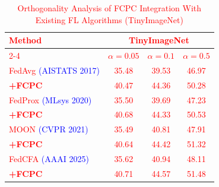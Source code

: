 \documentclass[journal,twoside,web]{ieeecolor}
\newcommand{\rev}[1]{\textcolor{red}{#1}}
\begin{document}





\begin{table}[!t]
\centering
\footnotesize %
\caption{Orthogonality Analysis of FCPC Integration With Existing FL Algorithms (TinyImageNet)}
\label{tab:tinyimagenet}
\rev{
\begin{tabular}{lccc}
\toprule
Method & \multicolumn{3}{c}{TinyImageNet} \\ %
\cmidrule(lr){2-4}  %
       & \textbf{$\alpha = 0.05$} & \textbf{$\alpha = 0.1$} & \textbf{$\alpha = 0.5$} \\
\midrule
FedAvg {\textcolor{blue}{\scriptsize (AISTATS 2017)}} & 35.48 & 39.53 & 46.97 \\ %
\textbf{  +FCPC} & 40.47 & 44.36 & 50.28 \\
\midrule
FedProx {\textcolor{blue}{\scriptsize (MLsys 2020)}} & 35.50 & 39.69 & 47.23 \\ %
\textbf{  +FCPC} & 40.68 & 44.33 & 50.53 \\
\midrule
MOON {\textcolor{blue}{\scriptsize (CVPR 2021)}} & 35.49 & 40.81 & 47.91 \\ %
\textbf{  +FCPC} & 40.64 & 44.42 & 51.32 \\
\midrule
FedCFA {\textcolor{blue}{\scriptsize (AAAI 2025)}} & 35.62 & 40.94 & 48.11 \\ %
\textbf{  +FCPC} & 40.71 & 44.57 & 51.48 \\
\bottomrule
\end{tabular}
}
\end{table}
\end{document}
